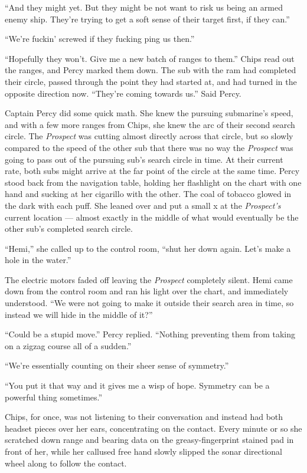 \documentclass[]{scrbook}
\begin{document}
``And they might yet. But they might be not want to risk us being an
armed enemy ship. They're trying to get a soft sense of their target
first, if they can.''

``We're fuckin' screwed if they fucking ping us then.''

``Hopefully they won't. Give me a new batch of ranges to them.'' Chips
read out the ranges, and Percy marked them down. The sub with the ram
had completed their circle, passed through the point they had started
at, and had turned in the opposite direction now. ``They're coming
towards us.'' Said Percy.

Captain Percy did some quick math. She knew the pursuing submarine's
speed, and with a few more ranges from Chips, she knew the arc of their
second search circle. The \emph{Prospect} was cutting almost directly
across that circle, but so slowly compared to the speed of the other sub
that there was no way the \emph{Prospect} was going to pass out of the
pursuing sub's search circle in time. At their current rate, both subs
might arrive at the far point of the circle at the same time. Percy
stood back from the navigation table, holding her flashlight on the
chart with one hand and sucking at her cigarillo with the other. The
coal of tobacco glowed in the dark with each puff. She leaned over and
put a small x at the \emph{Prospect's} current location --- almost
exactly in the middle of what would eventually be the other sub's
completed search circle.

``Hemi,'' she called up to the control room, ``shut her down again.
Let's make a hole in the water.''

The electric motors faded off leaving the \emph{Prospect} completely
silent. Hemi came down from the control room and ran his light over the
chart, and immediately understood. ``We were not going to make it
outside their search area in time, so instead we will hide in the middle
of it?''

``Could be a stupid move.'' Percy replied. ``Nothing preventing them
from taking on a zigzag course all of a sudden.''

``We're essentially counting on their sheer sense of symmetry.''

``You put it that way and it gives me a wisp of hope. Symmetry can be a
powerful thing sometimes.''

Chips, for once, was not listening to their conversation and instead had
both headset pieces over her ears, concentrating on the contact. Every
minute or so she scratched down range and bearing data on the
greasy-fingerprint stained pad in front of her, while her callused free
hand slowly slipped the sonar directional wheel along to follow the
contact.
\end{document}
